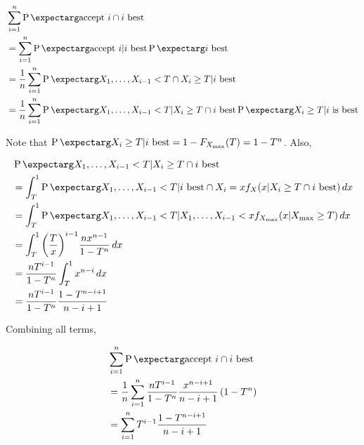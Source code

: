 \begin{align*}
&\sum_{i=1}^n \prob{\text{accept }i \cap i \text{ best}}\\
&= \sum_{i=1}^n \prob{\text{accept }i | i \text{ best}}\prob{i \text{ best}}\\
&= \frac{1}{n}\sum_{i=1}^n \prob{X_1,\dots,X_{i-1}<T \cap X_i \geq T | i \text{ best}}\\
&= \frac{1}{n}\sum_{i=1}^n \prob{X_1,\dots,X_{i-1}<T | X_i \geq T \cap i \text{ best}}\prob{X_i \geq T | i\text{ is best}}\\ 
\end{align*}

Note that $\prob{X_i \geq T | i \text{ best}} = 1-F_{X_{\max}}(T) = 1-T^n$. Also,

\begin{align*}
&\prob{X_1,\dots,X_{i-1}<T | X_i \geq T \cap i \text{ best}}\\
&= \int_{T}^1 \prob{X_1,\dots,X_{i-1}<T | i \text{ best} \cap X_i = x}f_{X}(x | X_i \geq T \cap i \text{ best})\,dx\\
&= \int_{T}^1 \prob{X_1,\dots,X_{i-1}<T | X_1,\dots,X_{i-1}<x}f_{X_{\max}}(x | X_{\max}\geq T)\,dx\\
&= \int_{T}^1 {\left(\frac{T}{x}\right)}^{i-1} \frac{nx^{n-1}}{1-T^{n}} \,dx\\
&= \frac{nT^{i-1}}{1-T^{n}}\int_{T}^1  x^{n-i} \,dx\\
&= \frac{nT^{i-1}}{1-T^{n}} \frac{1-T^{n-i+1}}{n-i+1}
\end{align*}

Combining all terms,

\begin{align*}
&\sum_{i=1}^n \prob{\text{accept }i \cap i \text{ best}}\\
&=\frac{1}{n}\sum_{i=1}^n \frac{nT^{i-1}}{1-T^{n}} \frac{x^{n-i+1}}{n-i+1} \left(1-T^n\right)\\
&=\sum_{i=1}^n T^{i-1} \frac{1-T^{n-i+1}}{n-i+1}\\
\end{align*}